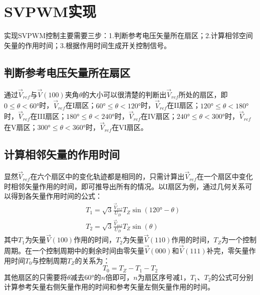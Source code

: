 \documentclass{ctexart}
\numberwithin{equation}{section}
\begin{document}
\section{SVPWM实现}
实现SVPWM控制主要需要三步：1.判断参考电压矢量所在扇区；2.计算相邻空间矢量的作用时间；3.根据作用时间生成开关控制信号。

\subsection{判断参考电压矢量所在扇区}

通过$ \vec{V}_{ref} $与$ \vec{V}{(100)} $夹角$ \theta $的大小可以很清楚的判断出$ \vec V_{ref} $所处的扇区，即$0\leq \theta<\ang{60}$时，$ \vec V_{ref} $在I扇区；$\ang{60} \leq \theta<\ang{120}$时，$ \vec V_{ref} $在II扇区；$\ang{120} \leq \theta<\ang{180}$时，$ \vec V_{ref} $在III扇区；$\ang{180} \leq \theta<\ang{240}$时，$ \vec V_{ref} $在IV扇区；$\ang{240} \leq \theta<\ang{300}$时，$ \vec V_{ref} $在V扇区；$\ang{300}\leq \theta<\ang{360}$时，$ \vec V_{ref} $在VI扇区。

\subsection{计算相邻矢量的作用时间}

显然$ \vec V_{ref} $在六个扇区中的变化轨迹都是相同的，只需计算出$ \vec V_{ref} $在一个扇区中变化时相邻矢量作用的时间，即可推导出所有的情况。以I扇区为例，通过几何关系可以得到各矢量作用时间的公式：
\begin{align}
& \label{eq:T1} T_{1}=\sqrt{3} \frac{\vec V_{ref}}{U_D} T_{Z} \sin \left(\ang{120}-\theta\right)\\
& \label{eq:T2} T_{2}=\sqrt{3} \frac{\vec V_{ref}}{U_D} T_{Z} \sin (\theta)
\end{align}
其中$T_1$为矢量$\vec V(100)$作用的时间，$T_2$为矢量$\vec V(110)$作用的时间，$T_Z$为一个控制周期。在一个控制周期中的剩余时间由零矢量$\vec V(000)$和$\vec V(111)$补完，零矢量作用时间$T_0$与控制周期$T_Z$的关系为：
\begin{equation} 
	T_{0}=T_{Z}-T_{1} -T_{2}
\end{equation}
其他扇区的只需要将$ \theta $减去\ang{60}的$ n $倍即可，$ n $为扇区序号减1，$T_1$、$T_2$的公式可分别计算参考矢量右侧矢量作用的时间和参考矢量左侧矢量作用的时间。
\end{document}

